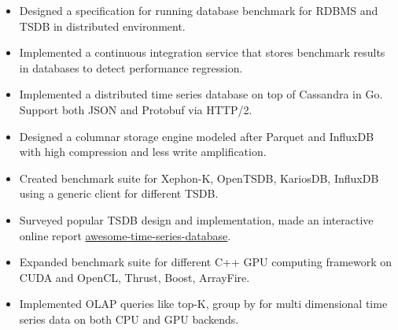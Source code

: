 \documentclass[11pt, letterpaper]{simple-cv}
\begin{document}


\begin{itemize}
	\item Designed a specification for running database benchmark for RDBMS and TSDB in distributed environment.
	\item Implemented a continuous integration service that stores benchmark results in databases to detect performance regression.
\end{itemize}


\begin{itemize}
	\item Implemented a distributed time series database on top of Cassandra in Go. Support both JSON and Protobuf via HTTP/2.
	\item Designed a columnar storage engine modeled after Parquet and InfluxDB with high compression and less write amplification.
	\item Created benchmark suite for Xephon-K, OpenTSDB, KariosDB, InfluxDB using a generic client for different TSDB.
	\item Surveyed popular TSDB design and implementation, made an interactive online report \href{https://xephonhq.github.io/awesome-time-series-database}{awesome-time-series-database}.
\end{itemize}


\begin{itemize}
	\item Expanded benchmark suite for different C++ GPU computing framework on CUDA and OpenCL, Thrust, Boost, ArrayFire.
	\item Implemented OLAP queries like top-K, group by for multi dimensional time series data on both CPU and GPU backends.
\end{itemize}
\end{document}
